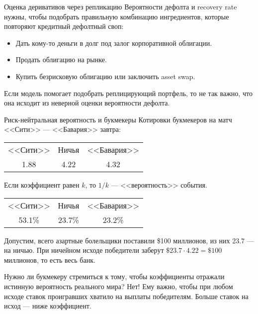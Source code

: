 \documentclass{beamer}
\begin{document}
\begin{frame}{Оценка деривативов через репликацию}
\justify
Вероятности дефолта и recovery rate нужны, чтобы подобрать правильную комбинацию 
ингредиентов, которые повторяют кредитный дефолтный своп:

\justify
\begin{itemize}
\justifying
\item Дать кому-то деньги в долг под залог корпоративной облигации.
\item Продать облигацию на рынке.
\item Купить безрисковую облигацию или заключить asset swap.
\end{itemize}

\justify
Если модель помогает подобрать реплицирующий портфель, то не так важно, что она исходит из неверной оценки вероятности дефолта.
\end{frame}



\begin{frame}{Риск-нейтральная вероятность и букмекеры}
\justify
Котировки букмекеров на матч <<Сити>> --- <<Бавария>> завтра:

\centering
\begin{tabular}{c|c|c}
<<Сити>> & Ничья & <<Бавария>> \\
1.88 & 4.22 & 4.32
\end{tabular}

\justify
Если коэффициент равен $k$, то $1/k$ --- <<вероятность>> события.

\centering
\begin{tabular}{c|c|c}
<<Сити>> & Ничья & <<Бавария>> \\
53.1\% & 23.7\% & 23.2\%
\end{tabular}

\justify
Допустим, всего азартные болельщики поставили \$100 миллионов, из них 23.7 --- на ничью. При 
ничейном исходе победители заберут $\$23.7 \cdot 4.22 = \$100$ миллионов, то 
есть весь банк.

\justify
Нужно ли букмекеру стремиться к тому, чтобы коэффициенты отражали истинную вероятность реального мира? Нет! Ему важно, чтобы при любом исходе ставок проигравших хватило на выплаты победителям. Больше ставок на исход --- ниже коэффициент.
\end{frame}
\end{document}
